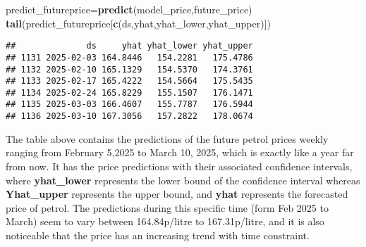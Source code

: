 \documentclass[
]{article}
\newenvironment{Shaded}{\begin{snugshade}}{\end{snugshade}}
\newcommand{\FunctionTok}[1]{\textcolor[rgb]{0.13,0.29,0.53}{\textbf{#1}}}
\newcommand{\NormalTok}[1]{#1}
\newcommand{\OtherTok}[1]{\textcolor[rgb]{0.56,0.35,0.01}{#1}}
\newcommand{\StringTok}[1]{\textcolor[rgb]{0.31,0.60,0.02}{#1}}
\begin{document}
\begin{Shaded}
\begin{Highlighting}[]
\NormalTok{predict\_futureprice}\OtherTok{=}\FunctionTok{predict}\NormalTok{(model\_price,future\_price)}
\FunctionTok{tail}\NormalTok{(predict\_futureprice[}\FunctionTok{c}\NormalTok{(}\StringTok{\textquotesingle{}ds\textquotesingle{}}\NormalTok{,}\StringTok{\textquotesingle{}yhat\textquotesingle{}}\NormalTok{,}\StringTok{\textquotesingle{}yhat\_lower\textquotesingle{}}\NormalTok{,}\StringTok{\textquotesingle{}yhat\_upper\textquotesingle{}}\NormalTok{)])}
\end{Highlighting}
\end{Shaded}

\begin{verbatim}
##              ds     yhat yhat_lower yhat_upper
## 1131 2025-02-03 164.8446   154.2281   175.4786
## 1132 2025-02-10 165.1329   154.5370   174.3761
## 1133 2025-02-17 165.4222   154.5664   175.5435
## 1134 2025-02-24 165.8229   155.1507   176.1471
## 1135 2025-03-03 166.4607   155.7787   176.5944
## 1136 2025-03-10 167.3056   157.2822   178.0674
\end{verbatim}

The table above contains the predictions of the future petrol prices
weekly ranging from February 5,2025 to March 10, 2025, which is exactly
like a year far from now. It has the price predictions with their
associated confidence intervals, where \textbf{yhat\_lower} represents
the lower bound of the confidence interval whereas \textbf{Yhat\_upper}
represents the upper bound, and \textbf{yhat} represents the forecasted
price of petrol. The predictions during this specific time (form Feb
2025 to March) seem to vary between 164.84p/litre to 167.31p/litre, and
it is also noticeable that the price has an increasing trend with time
constraint.
\end{document}
